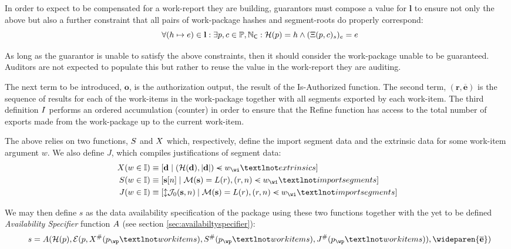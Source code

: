 In order to expect to be compensated for a work-report they are building, guarantors must compose a value for $\mathbf{l}$ to ensure not only the above but also a further constraint that all pairs of work-package hashes and segment-roots do properly correspond:
\begin{equation}
  \forall (h \mapsto e) \in \mathbf{l} : \exists p, c \in \mathbb{P}, \mathbb{N}_\mathsf{C} : \mathcal{H}(p) = h \wedge (\Xi(p, c)_s)_e = e\!\!\!\!
\end{equation}

As long as the guarantor is unable to satisfy the above constraints, then it should consider the work-package unable to be guaranteed. Auditors are not expected to populate this but rather to reuse the value in the work-report they are auditing.

The next term to be introduced, $\mathbf{o}$, is the authorization output, the result of the Is-Authorized function. The second term, $(\mathbf{r}, \overline{\mathbf{e}})$ is the sequence of results for each of the work-items in the work-package together with all segments exported by each work-item. The third definition $I$ performs an ordered accumulation (\ie counter) in order to ensure that the Refine function has access to the total number of exports made from the work-package up to the current work-item.

The above relies on two functions, $S$ and $X$ which, respectively, define the import segment data and the extrinsic data for some work-item argument $w$. We also define $J$, which compiles justifications of segment data:
\begin{equation}
  \begin{aligned}
    \extrinsicdata(\wiX \in \mathbb{I}) &\equiv [\mathbf{d} \mid (\mathcal{H}(\mathbf{d}), |\mathbf{d}|) \orderedin \wiX_\wi¬extrinsics] \\
    \importsegmentdata(\wiX \in \mathbb{I}) &\equiv [\mathbf{s}[n] \mid \mathcal{M}(\mathbf{s}) = L(r), (r, n) \orderedin \wiX_\wi¬importsegments] \\
    \justifysegmentdata(\wiX \in \mathbb{I}) &\equiv [\var{\mathcal{J}_0(\mathbf{s}, n)} \mid \mathcal{M}(\mathbf{s}) = L(r), (r, n) \orderedin \wiX_\wi¬importsegments]
  \end{aligned}
\end{equation}

We may then define $s$ as the data availability specification of the package using these two functions together with the yet to be defined \emph{Availability Specifier} function $A$ (see section \ref{sec:availabiltyspecifier}):
\begin{equation}
  s = \newavailabilityspecifier(
    \mathcal{H}(\wpX),
    \se(
      \wpX,
      \extrinsicdata^\#(\wpX_\wp¬workitems),
      \importsegmentdata^\#(\wpX_\wp¬workitems),
      \justifysegmentdata^\#(\wpX_\wp¬workitems)
    ),
    \wideparen{\overline{\mathbf{e}}}
  )\!\!\!\!
\end{equation}

